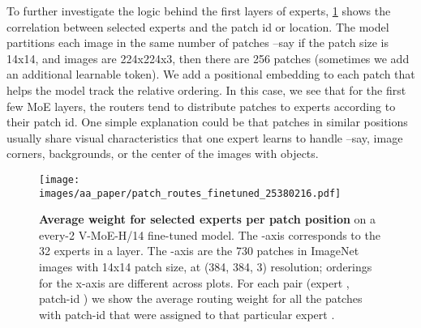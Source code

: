 \documentclass{article}
\newcommand{\abbv}{{V-MoE}}
\begin{document}
To further investigate the logic behind the first layers of experts, \cref{im:routes_patch_experts} shows the correlation between selected experts and the patch id or location.
The model partitions each image in the same number of patches --say if the patch size is 14x14, and images are 224x224x3, then there are 256 patches (sometimes we add an additional learnable token).
We add a positional embedding to each patch that helps the model track the relative ordering.
In this case, we see that for the first few MoE layers, the routers tend to distribute patches to experts according to their patch id.
One simple explanation could be that patches in similar positions usually share visual characteristics that one expert learns to handle --say, image corners, backgrounds, or the center of the images with objects.

\begin{figure}[h]
\centering
\texttt{[image: images/aa\_paper/patch\_routes\_finetuned\_25380216.pdf]}
\caption{
\textbf{Average weight for selected experts per patch position} on a every-2 \abbv{}-H/14 fine-tuned model.
The -axis corresponds to the 32 experts in a layer. The -axis are the 730 patches in ImageNet images with 14x14 patch size, at (384, 384, 3) resolution; orderings for the x-axis are different across plots.
For each pair (expert , patch-id ) we show the average routing weight for all the patches with patch-id  that were assigned to that particular expert .}
\label{im:routes_patch_experts}
\end{figure}
\end{document}
